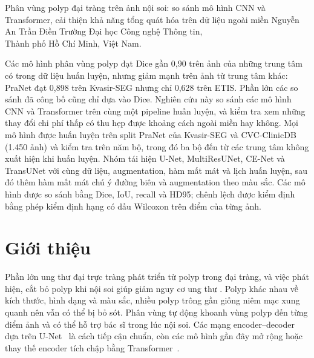 \documentclass[10pt,twoside]{article}
\begin{document}
\makereporttitle
  {Phân vùng polyp đại tràng trên ảnh nội soi: so sánh mô hình CNN và Transformer, cải thiện khả năng tổng quát hóa trên dữ liệu ngoài miền}
  {Nguyễn An Trần Điền}
  {Trường Đại học Công nghệ Thông tin,\\ Thành phố Hồ Chí Minh, Việt Nam.}

\begin{reportabstract}
 Các mô hình phân vùng polyp đạt Dice gần 0,90 trên ảnh của
những trung tâm có trong dữ liệu huấn luyện, nhưng giảm mạnh trên ảnh từ trung tâm
khác: PraNet đạt 0,898 trên Kvasir-SEG nhưng chỉ 0,628 trên ETIS. Phần lớn các so
sánh đã công bố cũng chỉ dựa vào Dice. Nghiên cứu này so sánh các mô hình CNN và
Transformer trên cùng một pipeline huấn luyện, và kiểm tra xem những thay đổi chi
phí thấp có thu hẹp được khoảng cách ngoài miền hay không.
 Mọi mô hình được huấn luyện trên split PraNet của
Kvasir-SEG và CVC-ClinicDB (1.450 ảnh) và kiểm tra trên năm bộ, trong đó ba bộ đến
từ các trung tâm không xuất hiện khi huấn luyện. Nhóm tái hiện U-Net, MultiResUNet,
CE-Net và TransUNet  với cùng dữ liệu, augmentation, hàm mất mát
và lịch huấn luyện, sau đó thêm hàm mất mát chú ý đường biên và augmentation theo
màu sắc. Các mô hình được so sánh bằng Dice, IoU, recall và HD95; chênh lệch được
kiểm định bằng phép kiểm định hạng có dấu Wilcoxon trên điểm của từng ảnh.
 
 
\end{reportabstract}

\section{Giới thiệu}
Phần lớn ung thư đại trực tràng phát triển từ polyp trong đại tràng, và việc phát
hiện, cắt bỏ polyp khi nội soi giúp giảm nguy cơ ung thư . Polyp
khác nhau về kích thước, hình dạng và màu sắc, nhiều polyp trông gần giống niêm mạc
xung quanh nên vẫn có thể bị bỏ sót. Phân vùng tự động khoanh vùng polyp đến từng
điểm ảnh và có thể hỗ trợ bác sĩ trong lúc nội soi. Các mạng encoder--decoder dựa trên
U-Net~\cite{ronneberger2015unet} là cách tiếp cận chuẩn, còn các mô hình gần đây mở
rộng hoặc thay thế encoder tích chập bằng
Transformer~\cite{chen2021transunet,cao2022swinunet}.
\end{document}
